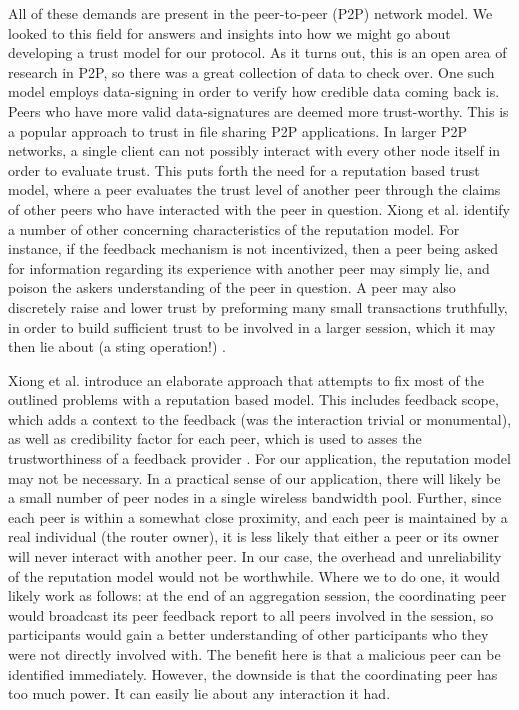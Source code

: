 \documentclass[12pt]{article}
\begin{document}
			All of these demands are present in the peer-to-peer (P2P) network model. We looked to this field for answers and insights into how we might go about developing a trust model for our protocol. As it turns out, this is an open area of research in P2P, so there was a great collection of data to check over. One such model employs data-signing in order to verify how credible data coming back is. Peers who have more valid data-signatures are deemed more trust-worthy. This is a popular approach to trust in file sharing P2P applications. In larger P2P networks, a single client can not possibly interact with every other node itself in order to evaluate trust. This puts forth the need for a reputation based trust model, where a peer evaluates the trust level of another peer through the claims of other peers who have interacted with the peer in question. Xiong et al. identify a number of other concerning characteristics of the reputation model. For instance, if the feedback mechanism is not incentivized, then a peer being asked for information regarding its experience with another peer may simply lie, and poison the askers understanding of the peer in question. A peer may also discretely raise and lower trust by preforming many small transactions truthfully, in order to build sufficient trust to be involved in a larger session, which it may then lie about (a sting operation!) \cite{1318566}.

			Xiong et al. introduce an elaborate approach that attempts to fix most of the outlined problems with a reputation based model. This includes feedback scope, which adds a context to the feedback (was the interaction trivial or monumental), as well as credibility factor for each peer, which is used to asses the trustworthiness of a feedback provider \cite{1318566}. For our application, the reputation model may not be necessary. In a practical sense of our application, there will likely be a small number of peer nodes in a single wireless bandwidth pool. Further, since each peer is within a somewhat close proximity, and each peer is maintained by a real individual (the router owner), it is less likely that either a peer or its owner will never interact with another peer. In our case, the overhead and unreliability of the reputation model would not be worthwhile. Where we to do one, it would likely work as follows: at the end of an aggregation session, the coordinating peer would broadcast its peer feedback report to all peers involved in the session, so participants would gain a better understanding of other participants who they were not directly involved with. The benefit here is that a malicious peer can be identified immediately. However, the downside is that the coordinating peer has too much power. It can easily lie about any interaction it had.
\end{document}
